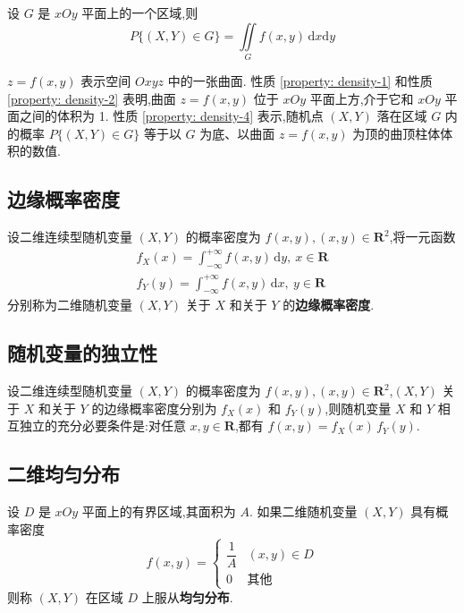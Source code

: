 \begin{property} \label{property: density-4}
    设 $G$ 是 $xOy$ 平面上的一个区域,则
    $$
    P\{(X,Y) \in G\} = \underset{G}{\iint} f(x,y) \, \text{d}x \text{d}y
    $$
\end{property}

$z=f(x,y)$ 表示空间 $Oxyz$ 中的一张曲面. 性质 \ref*{property: density-1} 和性质 \ref*{property: density-2} 表明,曲面 $z=f(x,y)$ 位于 $xOy$ 平面上方,介于它和 $xOy$ 平面之间的体积为 1. 性质 \ref*{property: density-4} 表示,随机点 $(X,Y)$ 落在区域 $G$ 内的概率 $P\{(X,Y) \in G\}$ 等于以 $G$ 为底、以曲面 $z=f(x,y)$ 为顶的曲顶柱体体积的数值.

\subsection{边缘概率密度}

\begin{definition}
    设二维连续型随机变量 $(X,Y)$ 的概率密度为 $f(x,y), (x,y) \in \mathbf{R}^2$,将一元函数
    \begin{gather*}
        f_{X}(x) = \int_{-\infty}^{+\infty} f(x,y) \, \text{d}y, \ x \in \mathbf{R} \\
        f_{Y}(y) = \int_{-\infty}^{+\infty} f(x,y) \, \text{d}x, \ y \in \mathbf{R}
    \end{gather*}
    分别称为二维随机变量 $(X,Y)$ 关于 $X$ 和关于 $Y$ 的\textbf{边缘概率密度}.
\end{definition}

\subsection{随机变量的独立性}

设二维连续型随机变量 $(X,Y)$ 的概率密度为 $f(x,y), (x,y) \in \mathbf{R}^2$,$(X,Y)$ 关于 $X$ 和关于 $Y$ 的边缘概率密度分别为 $f_{X}(x)$ 和 $f_{Y}(y)$,则随机变量 $X$ 和 $Y$ 相互独立的充分必要条件是:对任意 $x,y \in \mathbf{R}$,都有 $f(x,y)=f_{X}(x) \, f_{Y}(y)$.

\subsection{二维均匀分布}

设 $D$ 是 $xOy$ 平面上的有界区域,其面积为 $A$. 如果二维随机变量 $(X,Y)$ 具有概率密度
$$
f(x,y)=\begin{cases}
    \dfrac{1}{A} & (x,y) \in D \\[0.5em]
    0 & \text{其他}
\end{cases}
$$
则称 $(X,Y)$ 在区域 $D$ 上服从\textbf{均匀分布}.

